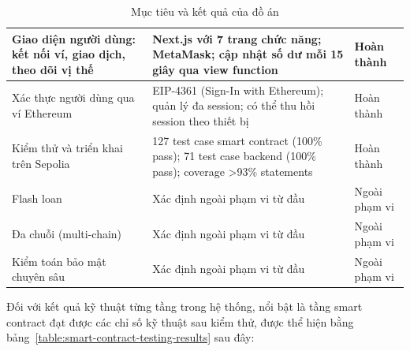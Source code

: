 \documentclass[../DoAn.tex]{subfiles}
\begin{document}
\begin{table}[H]
{\begin{tabular}{|p{}|p{}|p{}|}
Giao diện người dùng: kết nối ví, giao dịch, theo dõi vị thế & Next.js với 7 trang chức năng; MetaMask; cập nhật số dư mỗi 15 giây qua view function & Hoàn thành \\ \hline
Xác thực người dùng qua ví Ethereum & EIP-4361 (Sign-In with Ethereum); quản lý đa session; có thể thu hồi session theo thiết bị & Hoàn thành \\ \hline
Kiểm thử và triển khai trên Sepolia & 127 test case smart contract (100\% pass); 71 test case backend (100\% pass); coverage >93\% statements & Hoàn thành \\ \hline
Flash loan & Xác định ngoài phạm vi từ đầu & Ngoài phạm vi \\ \hline
Đa chuỗi (multi-chain) & Xác định ngoài phạm vi từ đầu & Ngoài phạm vi \\ \hline
Kiểm toán bảo mật chuyên sâu & Xác định ngoài phạm vi từ đầu & Ngoài phạm vi \\ \hline
\end{tabular}
}
\caption{Mục tiêu và kết quả của đồ án}
\label{table:conclusion}
\end{table}


Đối với kết quả kỹ thuật từng tầng trong hệ thống, nổi bật là tầng smart contract đạt được các chỉ số kỹ thuật sau kiểm thử, được thể hiện bằng bảng~\ref{table:smart-contract-testing-results} sau đây:

\begin{table}[H]
\centering
{}
\caption{Thông số kiểm thử smart contract}
\label{table:smart-contract-testing-results}
\end{table}
\end{document}
